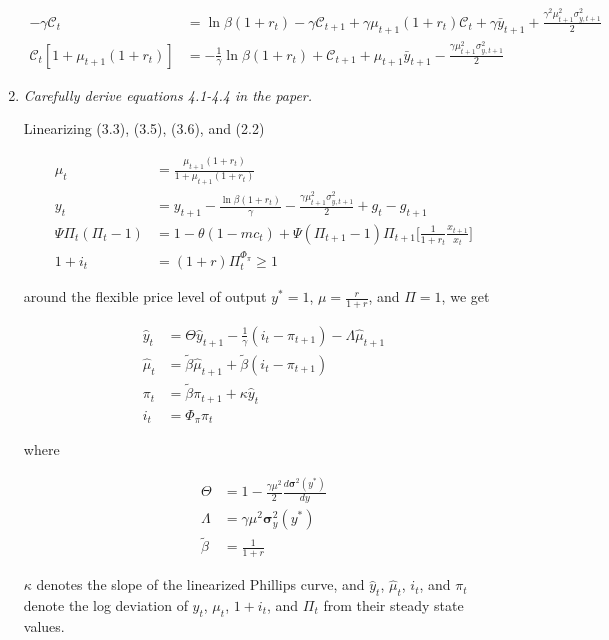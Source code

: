 \documentclass{article}
\newcommand{\C}{\mathcal{C}}
\begin{document}
\begin{enumerate}
\begin{align*}
-\gamma \C_t  &= \ln \beta (1 + r_t) -\gamma \C_{t+1}  +\gamma  \mu_{t+1} (1 + r_t) \C_t + \gamma\bar y_{t+1} + \frac{\gamma^2 \mu_{t+1}^2 \sigma_{y,t+1}^2}{2}\\
\C_t [1 + \mu_{t+1} (1 +r_t)] &= -\frac{1}{\gamma} \ln \beta (1+r_t) + \C_{t+1} + \mu_{t+1} \bar y_{t+1} - \frac{\gamma \mu_{t+1}^2 \sigma_{y, t+1}^2}{2} 
\end{align*}

\pagebreak

\item \textit{Carefully derive equations 4.1-4.4 in the paper.}

Linearizing (3.3), (3.5), (3.6), and (2.2)

\begin{align}
\mu_t &= \frac{\mu_{t+1}(1+r_t)}{1 + \mu_{t+1}(1+r_t)}\\
y_t &= y_{t+1} - \frac{\ln \beta (1+r_t)}{\gamma} - \frac{\gamma \mu_{t+1}^2 \sigma_{y,t+1}^2}{2} + g_t - g_{t+1}\\
\Psi \Pi_t(\Pi_t -1) &= 1 - \theta (1 - mc_t) + \Psi (\Pi_{t+1} - 1) \Pi_{t+1} \Bigg[ \frac{1}{1+r_t} \frac{x_{t+1}}{x_t} \Bigg]\\
1+i_t &= (1+r)\Pi_t^{\Phi_\pi} \ge 1
\end{align}

around the flexible price level of output $y^* = 1$, $\mu = \frac{r}{1+r}$, and $\Pi = 1$, we get

\begin{align}
\hat y_t &= \Theta \hat y_{t+1} - \frac{1}{\gamma} (i_t - \pi_{t+1}) - \Lambda \hat \mu_{t+1} \\ 
\hat \mu_t &= \tilde \beta \hat \mu_{t+1} + \tilde \beta (i_t - \pi_{t+1}) \\
\pi_t &= \tilde \beta \pi_{t+1} + \kappa \hat y_t\\
i_t &= \Phi_\pi \pi_t
\end{align}

where

\begin{align*}
\Theta &= 1 - \frac{\gamma \mu^2}{2} \frac{d \bm{\sigma}^2 (y^*)}{dy} \\
\Lambda &= \gamma \mu^2 \bm{\sigma}_y^2 ( y^*) \\
\tilde \beta &= \frac{1}{1 + r}
\end{align*}

$\kappa$ denotes the slope of the linearized Phillips curve, and $\hat y_t$, $\hat \mu_t$, $i_t$, and $\pi_t$ denote the log deviation of $y_t$, $\mu_t$, $1+i_t$, and $\Pi_t$ from their steady state values.

\end{enumerate}
\end{document}

